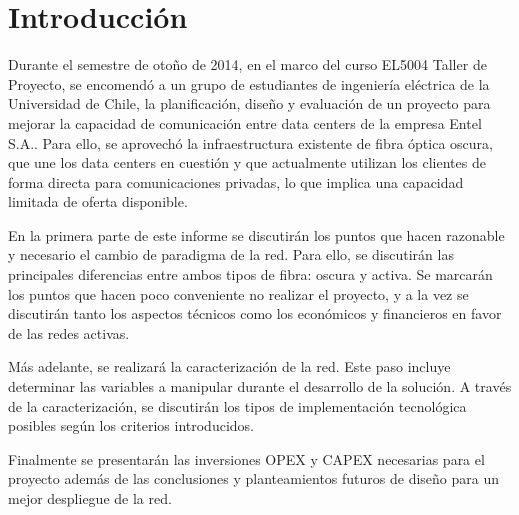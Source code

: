 \section{Introducci\'on}\label{sec:intro}

Durante el semestre de otoño de 2014, en el marco del curso EL5004 Taller de Proyecto, se encomendó a un grupo de estudiantes de ingeniería eléctrica de la Universidad de Chile, la planificación, diseño y evaluación de un proyecto para mejorar la capacidad de comunicación entre data centers de la empresa Entel S.A.. Para ello, se aprovechó la infraestructura existente de fibra óptica oscura, que une los data centers en cuestión y que actualmente utilizan los clientes de forma directa para comunicaciones privadas, lo que implica una capacidad limitada de oferta disponible.

En la primera parte de este informe se discutirán los puntos que hacen razonable y necesario el cambio de paradigma de la red. Para ello, se discutirán las principales diferencias entre ambos tipos de fibra: oscura y activa. Se marcarán los puntos que hacen poco conveniente no realizar el proyecto, y a la vez se discutirán tanto los aspectos técnicos como los económicos y financieros en favor de las redes activas.

Más adelante, se realizará la caracterización de la red. Este paso incluye determinar las variables a manipular durante el desarrollo de la solución. A través de la caracterización, se discutirán los tipos de implementación tecnológica posibles según los criterios introducidos.

Finalmente se presentarán las inversiones OPEX y CAPEX necesarias para el proyecto además de las conclusiones y planteamientos futuros de diseño para un mejor despliegue de la red.
